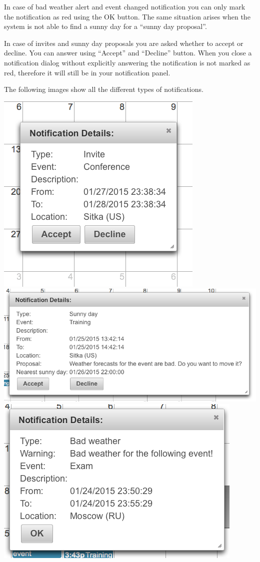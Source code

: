 \documentclass[10pt,a4paper,titlepage]{article}
\begin{document}
In case of bad weather alert and event changed notification you can only mark the notification as red using the OK button. The same situation arises when the system is not able to find a sunny day for a “sunny day proposal”. 

In case of invites and sunny day proposals you are asked whether to accept or decline. You can answer using “Accept” and “Decline” button. When you close a notification dialog without explicitly answering the notification is not marked as red, therefore it will still be in your notification panel.

The following images show all the different types of notifications.

\begin{center}
\includegraphics[width=0.7\linewidth]{./images/25_notification_invite}\vspace{10pt}
\includegraphics[width=0.7\linewidth]{./images/26_sunny_day_proposal}\vspace{10pt}
\includegraphics[width=0.7\linewidth]{./images/27_bad_weather_alert}\vspace{10pt}

\end{center}
\end{document}
